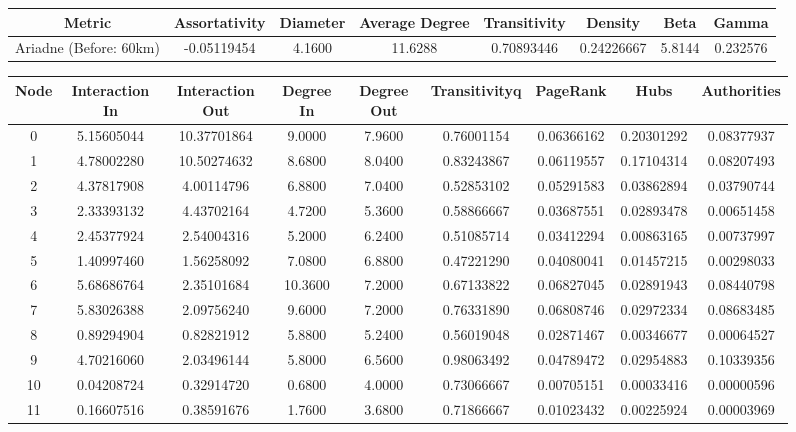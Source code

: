 \documentclass[12pt,a4paper]{thesis}
\begin{document}
\begin{figure}[H]
\centering
\tiny
\begin{tabular}{|c|c|c|c|c|c|c|c|}
\hline Metric & Assortativity & Diameter & Average Degree & Transitivity & Density & Beta & Gamma \\ 
\hline Ariadne (Before: 60km) & -0.05119454	& 4.1600 & 11.6288 & 0.70893446 & 0.24226667 & 5.8144 & 0.232576\\ 
\hline 
\end{tabular} 
\end{figure}


\begin{figure}[H]
\centering
\tiny
\begin{tabular}{|c|c|c|c|c|c|c|c|c|}
\hline	Node	&	Interaction In	&	Interaction Out	&	Degree In	&	Degree Out	&	Transitivityq	&	PageRank	&	Hubs	&	Authorities	\\
\hline	0	&	5.15605044	&	10.37701864	&	9.0000	&	7.9600	&	0.76001154	&	0.06366162	&	0.20301292	&	0.08377937	\\
\hline	1	&	4.78002280	&	10.50274632	&	8.6800	&	8.0400	&	0.83243867	&	0.06119557	&	0.17104314	&	0.08207493	\\
\hline	2	&	4.37817908	&	4.00114796	&	6.8800	&	7.0400	&	0.52853102	&	0.05291583	&	0.03862894	&	0.03790744	\\
\hline	3	&	2.33393132	&	4.43702164	&	4.7200	&	5.3600	&	0.58866667	&	0.03687551	&	0.02893478	&	0.00651458	\\
\hline	4	&	2.45377924	&	2.54004316	&	5.2000	&	6.2400	&	0.51085714	&	0.03412294	&	0.00863165	&	0.00737997	\\
\hline	5	&	1.40997460	&	1.56258092	&	7.0800	&	6.8800	&	0.47221290	&	0.04080041	&	0.01457215	&	0.00298033	\\
\hline	6	&	5.68686764	&	2.35101684	&	10.3600	&	7.2000	&	0.67133822	&	0.06827045	&	0.02891943	&	0.08440798	\\
\hline	7	&	5.83026388	&	2.09756240	&	9.6000	&	7.2000	&	0.76331890	&	0.06808746	&	0.02972334	&	0.08683485	\\
\hline	8	&	0.89294904	&	0.82821912	&	5.8800	&	5.2400	&	0.56019048	&	0.02871467	&	0.00346677	&	0.00064527	\\
\hline	9	&	4.70216060	&	2.03496144	&	5.8000	&	6.5600	&	0.98063492	&	0.04789472	&	0.02954883	&	0.10339356	\\
\hline	10	&	0.04208724	&	0.32914720	&	0.6800	&	4.0000	&	0.73066667	&	0.00705151	&	0.00033416	&	0.00000596	\\
\hline	11	&	0.16607516	&	0.38591676	&	1.7600	&	3.6800	&	0.71866667	&	0.01023432	&	0.00225924	&	0.00003969	\\

\end{tabular}
\end{figure}
\end{document}
